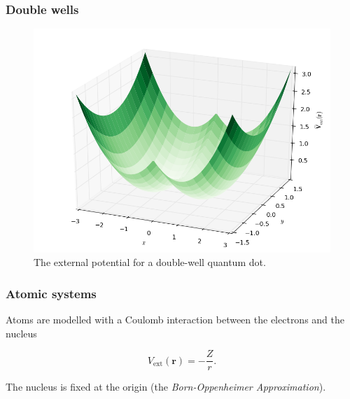 \begin{frame}
\frametitle{Double wells}
 \begin{figure}
 \begin{center}
  \includegraphics[scale=0.4]{../graphics/Potentials/doubleWell.png}
  \caption{The external potential for a double-well quantum dot.}
  \label{fig:extPotDoubleWell}
 \end{center}
\end{figure}
\end{frame}

\begin{frame}
 \frametitle{Atomic systems}
 
Atoms are modelled with a Coulomb interaction between the electrons and the nucleus 
 
 \begin{equation}
 V_\mathrm{ext}(\mathbf{r}) = -\frac{Z}{r}. \label{eq:v0hydro}
\end{equation}
\vspace{0.5cm}
 
The nucleus is fixed at the origin (the \textit{Born-Oppenheimer Approximation}).
 
\end{frame}

